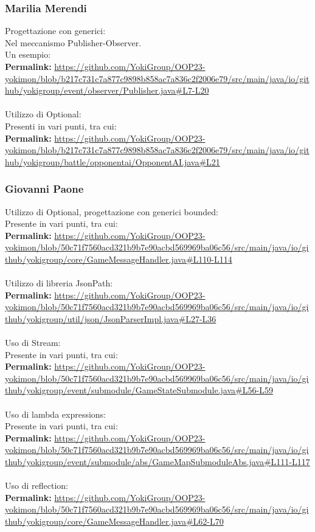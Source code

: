 \documentclass[a4paper,12pt]{report}
\begin{document}
\subsubsection{Marilia Merendi}
Progettazione con generici: \\
Nel meccanismo Publisher-Observer. \\
Un esempio: \\
\textbf{Permalink:} \url{https://github.com/YokiGroup/OOP23-yokimon/blob/b217c731c7a877c9898b858ac7a836c2f2006e79/src/main/java/io/github/yokigroup/event/observer/Publisher.java#L7-L20} \\
\\
Utilizzo di Optional: \\
Presenti in vari punti, tra cui: \\
\textbf{Permalink:} \url{https://github.com/YokiGroup/OOP23-yokimon/blob/b217c731c7a877c9898b858ac7a836c2f2006e79/src/main/java/io/github/yokigroup/battle/opponentai/OpponentAI.java#L21}
\subsubsection{Giovanni Paone}
Utilizzo di Optional, progettazione con generici bounded: \\
Presente in vari punti, tra cui: \\
\textbf{Permalink:} \url{https://github.com/YokiGroup/OOP23-yokimon/blob/50c71f7560acd321b9b7e90acbd569969ba06c56/src/main/java/io/github/yokigroup/core/GameMessageHandler.java#L110-L114} \\
\\
Utilizzo di libreria JsonPath: \\
\textbf{Permalink:} \url{https://github.com/YokiGroup/OOP23-yokimon/blob/50c71f7560acd321b9b7e90acbd569969ba06c56/src/main/java/io/github/yokigroup/util/json/JsonParserImpl.java#L27-L36} \\
\\
Uso di Stream: \\
Presente in vari punti, tra cui: \\
\textbf{Permalink:} \url{https://github.com/YokiGroup/OOP23-yokimon/blob/50c71f7560acd321b9b7e90acbd569969ba06c56/src/main/java/io/github/yokigroup/event/submodule/GameStateSubmodule.java#L56-L59} \\
\\
Uso di lambda expressions: \\
Presente in vari punti, tra cui: \\
\textbf{Permalink:} \url{https://github.com/YokiGroup/OOP23-yokimon/blob/50c71f7560acd321b9b7e90acbd569969ba06c56/src/main/java/io/github/yokigroup/event/submodule/abs/GameMapSubmoduleAbs.java#L111-L117} \\
\\
Uso di reflection: \\
\textbf{Permalink:} \url{https://github.com/YokiGroup/OOP23-yokimon/blob/50c71f7560acd321b9b7e90acbd569969ba06c56/src/main/java/io/github/yokigroup/core/GameMessageHandler.java#L62-L70}
\end{document}
